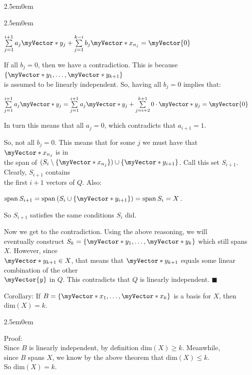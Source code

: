 \documentclass{book}
\newcommand{\hThree}{%
   \color{PineGreen!85!Orange}
   \fontsize{13}{15}\selectfont%
}
\newenvironment{myIndent}{%
   \begin{adjustwidth}{2.5em}{0em}%
}{%
   \end{adjustwidth}%
}
\newcommand{\uuline}[2][.]{%
{\vphantom{a}\color{#1}%
\rlap{\rule[-0.18em]{\widthof{#2}}{0.06em}}%
\rlap{\rule[-0.32em]{\widthof{#2}}{0.06em}}}%
#2}
\newcommand{\mySpan}{\mathrm{span}}
\newcommand{\myDim}[1]{\mathrm{dim}(#1)}
\newcommand{\retTwo}{\hfill\bigbreak}
\newcommand{\mVec}[1]{\myVector{#1}}
\newcommand{\mVecAst}[1]{\myVector*{#1}}
\begin{document}
{\begin{myIndent}
{\begin{myIndent}
      {\centering $\sum\limits_{j=1}^{i+1}a_j\mVecAst{y}_j +  \sum\limits_{j=1}^{k-i}b_j\mVecAst{x}_{n_j} = \mVec{0}$ \retTwo\par}

      If all $b_j = 0$, then we have a contradiction. This is because $\{\mVecAst{y}_1, \ldots, \mVecAst{y}_{k+1}\}$\\ is assumed to be linearly independent. So, having all $b_j = 0$ implies that:
      
      {\centering $\sum\limits_{j=1}^{i+1}a_j\mVecAst{y}_j = \sum\limits_{j=1}^{i+1}a_j\mVecAst{y}_j + \sum\limits_{j=i+2}^{k+1}0\cdot\mVecAst{y}_j = \mVec{0}$\par}
      
      In turn this means that all $a_j = 0$, which contradicts that $a_{i+1} = 1$.\retTwo

      So, not all $b_j = 0$. This means that for some $j$ we must have that $\mVecAst{x}_{n_{j}}$ is in\\ the span of $(S_i \setminus \{\mVecAst{x}_{n_{j}}\}) \cup \{\mVecAst{y}_{i+1}\}$. Call this set $S_{i+1}$. Clearly, $S_{i+1}$ contains\\ the first $i + 1$ vectors of $Q$. Also:
      
      {\centering$\mySpan\hspace{0.2em}{S_{i+1}} = \mySpan\hspace{0.2em}(S_{i} \cup \{\mVecAst{y}_{i+1}\}) = \mySpan\hspace{0.2em}S_i = X$.\retTwo\par}

      So $S_{i+1}$ satisfies the same conditions $S_i$ did.\retTwo

      Now we get to the contradiction. Using the above reasoning, we will\\ eventually construct $S_k = \{\mVecAst{y}_1, \ldots, \mVecAst{y}_k\}$ which still spans $X$. However, since\\ $\mVecAst{y}_{k+1} \in X$, that means that $\mVecAst{y}_{k+1}$ equals some linear combination of the other\\ $\mVec{y}$ in $Q$. This contradicts that $Q$ is linearly independent. $\blacksquare$\retTwo
   \end{myIndent}}

   \uuline{Corollary}: If $B = \{\mVecAst{x}_1, \ldots, \mVecAst{x}_k\}$ is a basis for $X$, then $\myDim{X} = k$.\retTwo

   {\begin{myIndent}\hThree
      Proof:\\
      Since $B$ is linearly independent, by definition $\myDim{X} \geq k$. Meanwhile,\\ since $B$ spans $X$, we know by the above theorem that $\myDim{X} \leq k$.\\ So $\myDim{X} = k$.
   \end{myIndent}}


\end{myIndent}}
\end{document}
